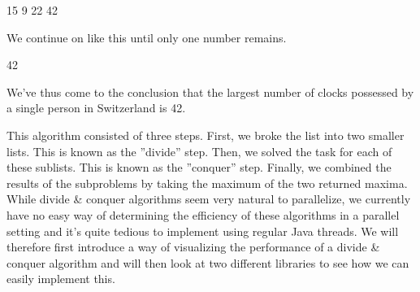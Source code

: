 \documentclass[main.tex]{subfiles}
\begin{document}
\begin{example}
    \begin{center}
        \hspace*{\fill} 15 \hspace*{\fill}  9 \hspace*{\fill} 22 \hspace*{\fill} 42 \hspace*{\fill}
    \end{center}
    We continue on like this until only one number remains.
    \begin{center}
        42
    \end{center}
    We've thus come to the conclusion that the largest number of clocks possessed by a single person in Switzerland is 42.
\end{example}
This algorithm consisted of three steps. First, we broke the list into two smaller lists. This is known as the ''divide'' step. Then, we solved the task for each of these sublists. This is known as the ''conquer'' step. Finally, we combined the results of the subproblems by taking the maximum of the two returned maxima.\\[0.3cm]
While divide \& conquer algorithms seem very natural to parallelize, we currently have no easy way of determining the efficiency of these algorithms in a parallel setting and it's quite tedious to implement using regular Java threads. We will therefore first introduce a way of visualizing the performance of a divide \& conquer algorithm and will then look at two different libraries to see how we can easily implement this.

\end{document}

